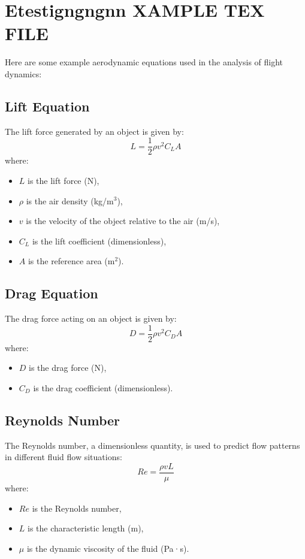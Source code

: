 \documentclass{article}
\begin{document}
\section{Etestigngngnn XAMPLE TEX FILE}
Here are some example aerodynamic equations used in the analysis of flight dynamics:

\subsection{Lift Equation}
The lift force generated by an object is given by:
\begin{equation}
    L = \frac{1}{2} \rho v^2 C_L A
\end{equation}
where:
\begin{itemize}
    \item $L$ is the lift force (N),
    \item $\rho$ is the air density (kg/m\(^3\)),
    \item $v$ is the velocity of the object relative to the air (m/s),
    \item $C_L$ is the lift coefficient (dimensionless),
    \item $A$ is the reference area (m\(^2\)).
\end{itemize}

\subsection{Drag Equation}
The drag force acting on an object is given by:
\begin{equation}
    D = \frac{1}{2} \rho v^2 C_D A
\end{equation}
where:
\begin{itemize}
    \item $D$ is the drag force (N),
    \item $C_D$ is the drag coefficient (dimensionless).
\end{itemize}

\subsection{Reynolds Number}
The Reynolds number, a dimensionless quantity, is used to predict flow patterns in different fluid flow situations:
\begin{equation}
    Re = \frac{\rho v L}{\mu}
\end{equation}
where:
\begin{itemize}
    \item $Re$ is the Reynolds number,
    \item $L$ is the characteristic length (m),
    \item $\mu$ is the dynamic viscosity of the fluid (Pa·s).
\end{itemize}
\end{document}
